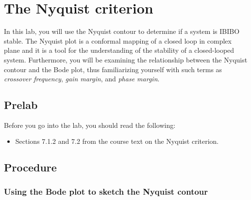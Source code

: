 \chapter{The Nyquist criterion}

In this lab, you will use the Nyquist contour to determine if a system is
IBIBO stable.  The Nyquist plot is a conformal mapping of a closed loop in
complex plane and it is a tool for the understanding of the stability of a
closed-looped system.  Furthermore, you will be examining the relationship
between the Nyquist contour and the Bode plot, thus familiarizing yourself
with such terms as \emph{crossover frequency}\@, \emph{gain margin}\@, and
\emph{phase margin}\@.

\section{Prelab}

Before you go into the lab, you should read the following:
\begin{itemize}
\item Sections 7.1.2 and 7.2 from the course text on the Nyquist criterion.
\end{itemize}

\section{Procedure}

\subsection{Using the Bode plot to sketch the Nyquist
contour}\label{sec:bodeNyquist}

